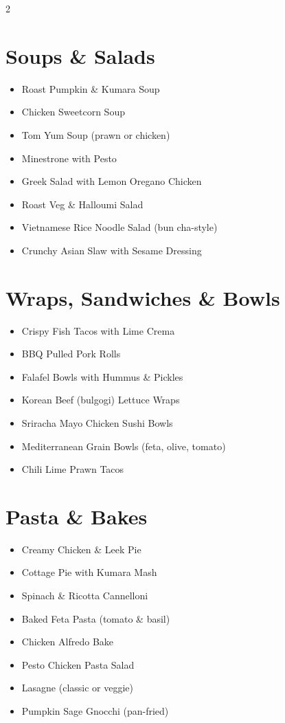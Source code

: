 \documentclass[13pt,a4paper]{book}
\begin{document}
\begin{multicols}{2}
\section*{Soups \& Salads}
\begin{itemize}
\item Roast Pumpkin \& Kumara Soup
\item Chicken Sweetcorn Soup
\item Tom Yum Soup (prawn or chicken)
\item Minestrone with Pesto
\item Greek Salad with Lemon Oregano Chicken
\item Roast Veg \& Halloumi Salad
\item Vietnamese Rice Noodle Salad (bun cha-style)
\item Crunchy Asian Slaw with Sesame Dressing
\end{itemize}

\section*{Wraps, Sandwiches \& Bowls}
\begin{itemize}
\item Crispy Fish Tacos with Lime Crema
\item BBQ Pulled Pork Rolls
\item Falafel Bowls with Hummus \& Pickles
\item Korean Beef (bulgogi) Lettuce Wraps
\item Sriracha Mayo Chicken Sushi Bowls
\item Mediterranean Grain Bowls (feta, olive, tomato)
\item Chili Lime Prawn Tacos
\end{itemize}

\section*{Pasta \& Bakes}
\begin{itemize}
\item Creamy Chicken \& Leek Pie
\item Cottage Pie with Kumara Mash
\item Spinach \& Ricotta Cannelloni
\item Baked Feta Pasta (tomato \& basil)
\item Chicken Alfredo Bake
\item Pesto Chicken Pasta Salad
\item Lasagne (classic or veggie)
\item Pumpkin Sage Gnocchi (pan-fried)
\end{itemize}


\end{multicols}
\end{document}
